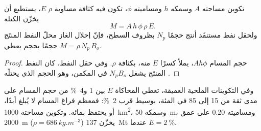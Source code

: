 \begin{omfigure}
\begin{minipage}[b]{0.49\linewidth}
\end{minipage}
\par{}
\end{omfigure}

\begin{proposition}\label{prop:b2:energy-geology:capacity}
تكوين مساحته $A$ وسمكه $h$ ومساميته $\phi$، تكون فيه كثافة  مساوية $\rho$
 $E$، يستطيع أن يخزّن الكتلة
\begin{equation}
M = A\,h\,\phi\,\rho\,E .
\label{eq:b2:energy-geology:capacity}
\end{equation}
ولحقل نفط مستنفَد أنتج حجمًا $N_p$ بظروف السطح، فإنّ إحلال الغاز محلّ النفط المنتَج
حجمًا بحجم يعطي $M = \rho\,N_p\,B_o$.
\end{proposition}

\begin{proof}
حجم المسام $Ah\phi$، يملأ  كسرًا $E$ منه، بكثافة $\rho$. وفي
حقل النفط، كان النفط المنتَج يشغل $N_pB_o$ في المكمن، وهو الحجم الذي يحتلّه .
\end{proof}

وفي التكوينات الملحية العميقة، تعطي المحاكاة $E$ بين 1 و\qty{4}{\percent} من حجم المسام
على مدى ثقة من 15 إلى 85 في المئة، بوسيط قرب \qty{2}{\percent}: فمعظم فراغ المسام
لا يُبلغ أبدًا، أو يحتفظ بمائه. وتكوين مساحته \qty{1000}{km^2}، وسمكه \qty{50}{m}،
ومساميته 0.20 على عمق \qty{2000}{m} ($\rho = \qty{686}{kg.m^{-3}}$) يخزّن \qty{137}{Mt} عندما $E =
\qty{2}{\percent}$.

